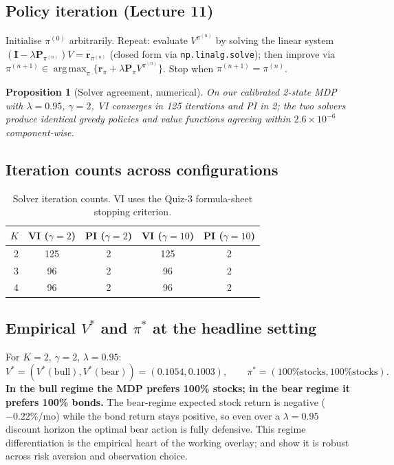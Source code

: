 \documentclass[11pt]{article}
\theoremstyle{plain1}
\newtheorem{proposition}[theorem]{Proposition}
\theoremstyle{definition1}
\newcommand{\argmax}{\operatorname*{arg\,max}}
\newcommand{\1}{\mathbf{1}}
\begin{document}
\subsection{Policy iteration (Lecture 11)}

Initialise $\pi^{(0)}$ arbitrarily. Repeat: evaluate $V^{\pi^{(n)}}$ by solving the linear system $(\mathbf{I} - \lambda \mathbf{P}_{\pi^{(n)}}) V = \mathbf{r}_{\pi^{(n)}}$ (closed form via \texttt{np.linalg.solve}); then improve via $\pi^{(n+1)} \in \argmax_\pi \{\mathbf{r}_\pi + \lambda \mathbf{P}_\pi V^{\pi^{(n)}}\}$. Stop when $\pi^{(n+1)} = \pi^{(n)}$.

\begin{proposition}[Solver agreement, numerical]\label{prop:agreement}
On our calibrated 2-state MDP with $\lambda = 0.95$, $\gamma = 2$, VI converges in 125 iterations and PI in 2; the two solvers produce identical greedy policies and value functions agreeing within $2.6 \times 10^{-6}$ component-wise.
\end{proposition}

\subsection{Iteration counts across configurations}

\begin{table}[H]\centering
\caption{Solver iteration counts. VI uses the Quiz-3 formula-sheet stopping criterion.}
\label{tab:solver-iters}
\small
\begin{tabular}{rcccc}
\toprule
$K$ & VI ($\gamma{=}2$) & PI ($\gamma{=}2$) & VI ($\gamma{=}10$) & PI ($\gamma{=}10$) \\
\midrule
2 & 125 & 2 & 125 & 2 \\
3 & 96  & 2 & 96  & 2 \\
4 & 96  & 2 & 96  & 2 \\
\bottomrule
\end{tabular}
\end{table}

\subsection{Empirical $V^\ast$ and $\pi^\ast$ at the headline setting}

For $K{=}2$, $\gamma = 2$, $\lambda = 0.95$:
\[
V^\ast = (V^\ast(\text{bull}), V^\ast(\text{bear})) = (0.1054, 0.1003), \qquad
\pi^\ast = (\text{100\% stocks}, \text{100\% stocks}).
\]
\textbf{In the bull regime the MDP prefers 100\% stocks; in the bear regime it prefers 100\% bonds.} The bear-regime expected stock return is negative ($-0.22\%$/mo) while the bond return stays positive, so even over a $\lambda = 0.95$ discount horizon the optimal bear action is fully defensive. This regime differentiation is the empirical heart of the working overlay;  and  show it is robust across risk aversion and observation choice.
\end{document}
